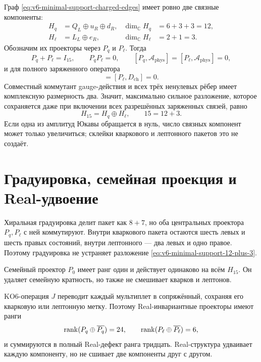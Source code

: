 Граф \eqref{eq:v6-minimal-support-charged-edges} имеет ровно две связные
компоненты:
\begin{align}
 H_q&=Q_L\oplus u_R\oplus d_R,
 &\dim_{\mathbb C}H_q&=6+3+3=12,\\
 H_\ell&=L_L\oplus e_R,
 &\dim_{\mathbb C}H_\ell&=2+1=3.
\end{align}
Обозначим их проекторы через $P_q$ и $P_\ell$. Тогда
\begin{equation}
 P_q+P_\ell=I_{15},
 \qquad
 P_qP_\ell=0,
 \qquad
 [P_q,\mathcal A_{\mathrm{phys}}]
 =[P_\ell,\mathcal A_{\mathrm{phys}}]=0,
\end{equation}
и для полного заряженного оператора
\begin{equation}
 [P_q,D_{\mathrm{ch}}]=[P_\ell,D_{\mathrm{ch}}]=0.
\end{equation}
Совместный коммутант gauge-действия и всех трёх ненулевых рёбер имеет
комплексную размерность два. Значит, максимально сильное разложение,
которое сохраняется даже при включении всех разрешённых заряженных
связей, равно
\begin{equation}
 H_{15}=H_q\oplus H_\ell,
 \qquad 15=12+3.
 \label{eq:v6-minimal-support-12-plus-3}
\end{equation}
Если одна из амплитуд Юкавы обращается в нуль, число связных компонент
может только увеличиться; склейки кваркового и лептонного пакетов это не
создаёт.

\section{Градуировка, семейная проекция и Real-удвоение}

Хиральная градуировка делит пакет как $8+7$, но оба центральных проектора
$P_q,P_\ell$ с ней коммутируют. Внутри кваркового пакета остаются шесть
левых и шесть правых состояний, внутри лептонного --- два левых и одно
правое. Поэтому градуировка не устраняет разложение
\eqref{eq:v6-minimal-support-12-plus-3}.

Семейный проектор $P_0$ имеет ранг один и действует одинаково на всём
$H_{15}$. Он удаляет семейную кратность, но также не смешивает кварков и
лептонов.

KO6-операция $J$ переводит каждый мультиплет в сопряжённый, сохраняя его
кварковую или лептонную метку. Поэтому Real-инвариантные проекторы имеют
ранги
\begin{equation}
 \operatorname{rank}(P_q\oplus\overline{P_q})=24,
 \qquad
 \operatorname{rank}(P_\ell\oplus\overline{P_\ell})=6,
\end{equation}
и суммируются в полный Real-дефект ранга тридцать. Real-структура удваивает
каждую компоненту, но не сшивает две компоненты друг с другом.

